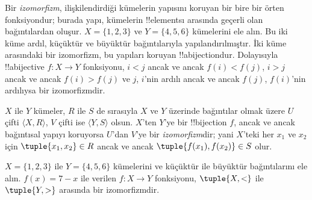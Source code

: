 


\begin{explain}
Bir \emph{izomorfizm}, ilişkilendirdiği kümelerin yapısını koruyan bir
bire bir örten fonksiyondur; burada yapı, kümelerin !!{element}s{}ı arasında
geçerli olan bağıntılardan oluşur. $X=\{1,2,3\}$ ve $Y=\{4,5,6\}$ kümelerini
ele alın. Bu iki küme ardıl, küçüktür ve büyüktür bağıntılarıyla
yapılandırılmıştır. İki küme arasındaki bir izomorfizm, bu yapıları koruyan
!!a{bijection}{}dur. Dolayısıyla !!a{bijective} $f \colon X \to Y$ fonksiyonu,
$i<j$ ancak ve ancak $f(i)<f(j)$, $i>j$ ancak ve ancak $f(i)>f(j)$ ve $j$,
$i$'nin ardılı ancak ve ancak $f(j)$, $f(i)$'nin ardılıysa bir izomorfizmdir.
\end{explain}

\begin{defn}[İzomorfizm]
$X$ ile $Y$ kümeler, $R$ ile $S$ de sırasıyla $X$ ve $Y$ üzerinde bağıntılar
olmak üzere $U$ çifti $\langle X, R\rangle$, $V$ çifti ise $\langle Y,
S\rangle$ olsun. $X$'ten $Y$'ye bir !!{bijection} $f$, ancak ve ancak
bağıntısal yapıyı koruyorsa $U$'dan $V$'ye bir \emph{izomorfizm}dir; yani
$X$'teki her $x_{1}$ ve $x_{2}$ için $\tuple{x_1,x_2} \in R$ ancak ve ancak
$\tuple{f(x_1),f(x_2)} \in S$ olur.
\end{defn}

\begin{ex}
$X=\{1,2,3\}$ ile $Y=\{4,5,6\}$ kümelerini ve küçüktür ile büyüktür
bağıntılarını ele alın. $f(x) = 7-x$ ile verilen $f\colon X \to Y$ fonksiyonu,
$\tuple{X,<}$ ile $\tuple{Y,>}$ arasında bir izomorfizmdir.
\end{ex}

